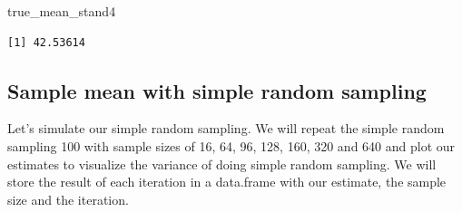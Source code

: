 \documentclass[
  letterpaper,
  DIV=11,
  numbers=noendperiod]{scrartcl}
\newenvironment{Shaded}{\begin{snugshade}}{\end{snugshade}}
\newcommand{\NormalTok}[1]{\textcolor[rgb]{0.00,0.23,0.31}{#1}}
\begin{document}
\begin{Shaded}
\begin{Highlighting}[]
\NormalTok{true\_mean\_stand4}
\end{Highlighting}
\end{Shaded}

\begin{verbatim}
[1] 42.53614
\end{verbatim}

\hypertarget{sample-mean-with-simple-random-sampling}{%
\subsection{Sample mean with simple random
sampling}\label{sample-mean-with-simple-random-sampling}}

Let's simulate our simple random sampling. We will repeat the simple
random sampling 100 with sample sizes of 16, 64, 96, 128, 160, 320 and
640 and plot our estimates to visualize the variance of doing simple
random sampling. We will store the result of each iteration in a
data.frame with our estimate, the sample size and the iteration.
\end{document}
